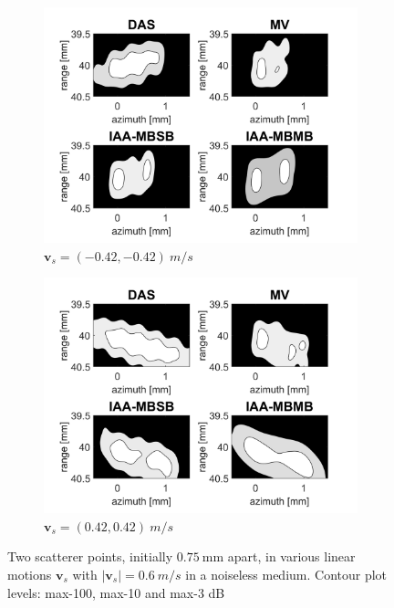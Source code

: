 \begin{figure}[ht]
\begin{subfigure}[t]{0.48\linewidth}
        \includegraphics[width=\linewidth]{./images/results/4/motion_45_-06.png}
        \caption{$\boldsymbol{v}_s = (-0.42, -0.42)~m/s$}
        \label{fig:mla_g}
    \end{subfigure}
    \quad
    \begin{subfigure}[t]{0.48\linewidth}
        \includegraphics[width=\linewidth]{./images/results/4/motion_45_06.png}
        \caption{$\boldsymbol{v}_s = (0.42, 0.42)~m/s$}
        \label{fig:mla_h}
    \end{subfigure}
	\caption{Two scatterer points, initially $0.75~$mm apart, in various linear motions $\boldsymbol{v}_s$ with $|\boldsymbol{v}_s|=0.6~m/s$ in a noiseless medium. Contour plot levels: max-100, max-10 and max-3 dB}
	\label{fig:two_points_linear_motion_mla}
\end{figure}